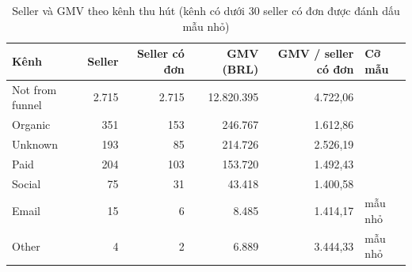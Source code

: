 \begin{table}[htbp]
\centering\small
\caption{Seller và GMV theo kênh thu hút (kênh có dưới 30 seller có đơn được đánh dấu mẫu nhỏ)}
\label{tab:seller-channel}
\begin{tabular}{lrrrrl}
\toprule
\textbf{Kênh} & \textbf{Seller} & \textbf{Seller có đơn} & \textbf{GMV (BRL)} & \textbf{GMV / seller có đơn} & \textbf{Cỡ mẫu} \\
\midrule
Not from funnel & 2.715 & 2.715 & 12.820.395 & 4.722,06 &  \\
Organic & 351 & 153 & 246.767 & 1.612,86 &  \\
Unknown & 193 & 85 & 214.726 & 2.526,19 &  \\
Paid & 204 & 103 & 153.720 & 1.492,43 &  \\
Social & 75 & 31 & 43.418 & 1.400,58 &  \\
Email & 15 & 6 & 8.485 & 1.414,17 & mẫu nhỏ \\
Other & 4 & 2 & 6.889 & 3.444,33 & mẫu nhỏ \\
\bottomrule
\end{tabular}
\end{table}
